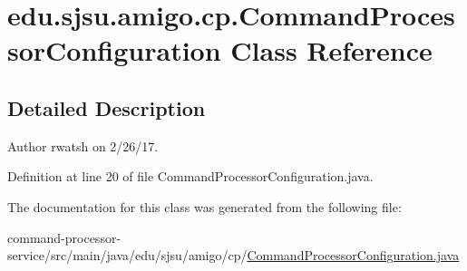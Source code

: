 \hypertarget{classedu_1_1sjsu_1_1amigo_1_1cp_1_1_command_processor_configuration}{}\section{edu.\+sjsu.\+amigo.\+cp.\+Command\+Processor\+Configuration Class Reference}
\label{classedu_1_1sjsu_1_1amigo_1_1cp_1_1_command_processor_configuration}


\subsection{Detailed Description}
\begin{DoxyAuthor}{Author}
rwatsh on 2/26/17. 
\end{DoxyAuthor}


Definition at line 20 of file Command\+Processor\+Configuration.\+java.



The documentation for this class was generated from the following file\+:\begin{DoxyCompactItemize}
\item 
command-\/processor-\/service/src/main/java/edu/sjsu/amigo/cp/\hyperlink{_command_processor_configuration_8java}{Command\+Processor\+Configuration.\+java}\end{DoxyCompactItemize}
